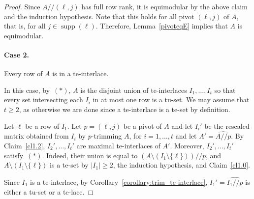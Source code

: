\documentclass[11pt,a4paper]{amsart}
\renewcommand*{\geq}{\geqslant}
\theoremstyle{plain}
\newtheorem{claimnumb}{Claim}[theorem]{\itshape}{\rmfamily}
\theoremstyle{definition}
\DeclareMathOperator{\supp}{supp}
\newcommand{\trim}{/\!\!/}
\begin{document}
\begin{proof}
Since $A\trim (\ell,j)$ has full row rank, it is equimodular by the above claim and the induction hypothesis.
Note that this holds for all pivot $(\ell,j)$ of $A$, that is, for all $j\in\supp(\ell)$.
Therefore, Lemma~\ref{pivoteqE} implies that $A$ is equimodular.
\medskip

\paragraph{\bf Case 2.} Every row of $A$ is in a te-interlace.

\medskip

In this case, by~$(\ast)$, $A$ is the disjoint union of te-interlaces $I_1,\dots,I_t$ so that every set intersecting each $I_i$ in at most one row is a tu-set.
We may assume that $t\geq 2$, as otherwise we are done since a te-interlace is a te-set by definition.

Let $\ell$ be a row of $I_1$.
Let $p=(\ell,j)$ be a pivot of $A$ and let $I_i'$ be the rescaled matrix obtained from $I_i$ by $p$-trimming $A$, for $i=1,\dots,t$ and let $A'=\widehat{A\trim p}$.
By Claim~\ref{cl1.2}, $I_2',\ldots,I_t'$ are maximal te-interlaces of $A'$. 
Moreover, $I_2',\ldots,I_t'$ satisfy~$(\ast)$.
Indeed, their union is equal to $(A\setminus (I_1\setminus\{\ell\}))\trim p$, and $A\setminus (I_1\setminus\{\ell\})$ is a te-set by $|I_1|\geq 2$, the induction hypothesis, and Claim~\ref{cl1.0}.



%					

Since $I_1$ is a te-interlace, by Corollary~\ref{corollary:trim_te-interlace}, $I_1'=\widehat{I_1\trim p}$ is either a tu-set or a te-lace.


\end{proof}
\end{document}
